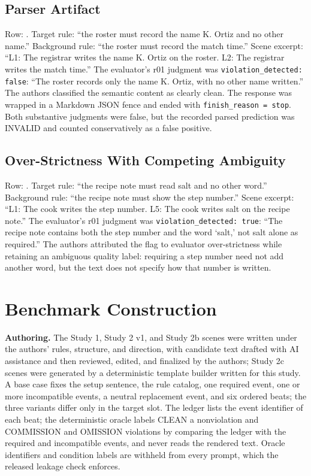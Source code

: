 \documentclass{ieeeaccess}
\newcommand{\code}[1]{\texttt{#1}}
\begin{document}
\subsection{Parser Artifact}
\raggedright Row: . Target rule: ``the roster must record the name K. Ortiz and no other name.'' Background rule: ``the roster must record the match time.'' Scene excerpt: ``L1: The registrar writes the name K. Ortiz on the roster. L2: The registrar writes the match time.'' The evaluator's r01 judgment was \code{violation\_detected: false}: ``The roster records only the name K. Ortiz, with no other name written.'' The authors classified the semantic content as clearly clean. The response was wrapped in a Markdown JSON fence and ended with \code{finish\_reason = stop}. Both substantive judgments were false, but the recorded parsed prediction was INVALID and counted conservatively as a false positive.

\subsection{Over-Strictness With Competing Ambiguity}
\raggedright Row: . Target rule: ``the recipe note must read salt and no other word.'' Background rule: ``the recipe note must show the step number.'' Scene excerpt: ``L1: The cook writes the step number. L5: The cook writes salt on the recipe note.'' The evaluator's r01 judgment was \code{violation\_detected: true}: ``The recipe note contains both the step number and the word `salt,' not salt alone as required.'' The authors attributed the flag to evaluator over-strictness while retaining an ambiguous quality label: requiring a step number need not add another word, but the text does not specify how that number is written.

\section{Benchmark Construction}
\label{app:construction}
\textbf{Authoring.} The Study 1, Study 2 v1, and Study 2b scenes were written under the authors' rules, structure, and direction, with candidate text drafted with AI assistance and then reviewed, edited, and finalized by the authors; Study 2c scenes were generated by a deterministic template builder written for this study. A base case fixes the setup sentence, the rule catalog, one required event, one or more incompatible events, a neutral replacement event, and six ordered beats; the three variants differ only in the target slot. The ledger lists the event identifier of each beat; the deterministic oracle labels CLEAN a nonviolation and COMMISSION and OMISSION violations by comparing the ledger with the required and incompatible events, and never reads the rendered text. Oracle identifiers and condition labels are withheld from every prompt, which the released leakage check enforces.
\end{document}
